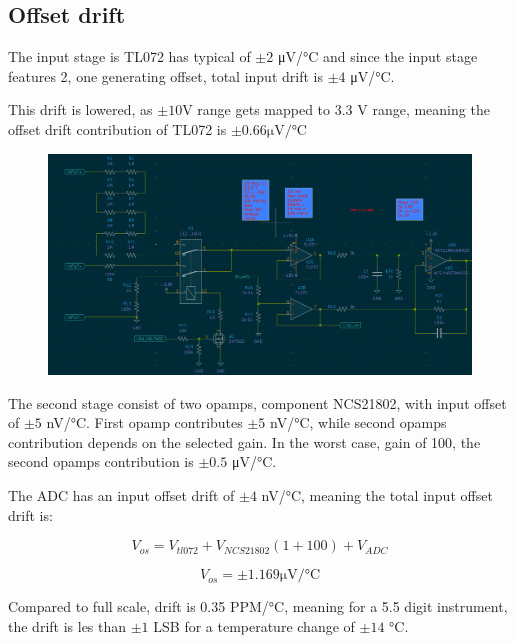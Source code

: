 \documentclass[11pt]{article}
\begin{document}
\subsection{Offset drift}

The input stage is TL072 has typical of $\pm 2$ \si{\micro \volt / \celsius} and 
since the input stage features 2, one generating offset, total input 
drift is $\pm 4$ \si{\micro \volt / \celsius}. 

This drift is lowered, as $\pm 10 \si{\volt}$ range gets mapped to 3.3 \si{\volt}
range, meaning the offset drift contribution of TL072 is 
$\pm0.66  \si{\micro \volt / \celsius}$

\begin{figure}[H]
  \centering 
  \includegraphics[scale=0.55]{"./figs/Input_amp.png"}
\end{figure}


The second stage consist of two opamps, component NCS21802,
with input offset of $\pm 5$ \si{\nano \volt / \celsius}. First opamp
contributes $\pm 5$ \si{\nano \volt / \celsius}, while second opamps
contribution depends on the selected gain. In the worst case, gain of 
100, the second opamps contribution is $\pm 0.5$ \si{\micro \volt / \celsius}.

The ADC has an input offset drift of $\pm 4$ \si{\nano \volt / \celsius},
meaning the total input offset drift is: 

\begin{equation}
  V_{os} = V_{tl072} + V_{NCS21802} (1 + 100) + V_{ADC}
  \label{eq:offset_1}
\end{equation}

\begin{equation}
  V_{os} = \pm 1.169 \si{\micro \volt / \celsius}
  \label{eq:offset_2}
\end{equation}

Compared to full scale, drift is 0.35 \si{PPM/\celsius},
meaning for a 5.5 digit instrument, the drift is 
les than $\pm1$ LSB for a temperature change of
$\pm 14$ \si{\celsius}.
\end{document}
